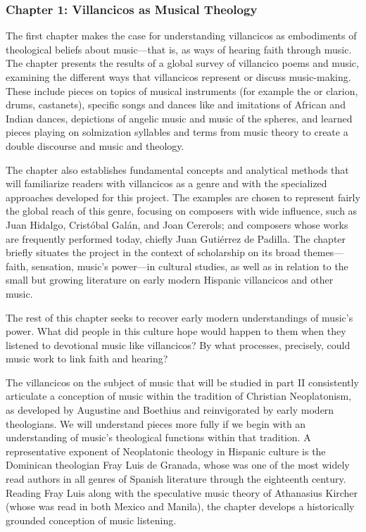 \documentclass{vcbook-proposal}
\begin{document}
\subsubsection{Chapter 1: Villancicos as Musical Theology}

The first chapter makes the case for understanding villancicos as embodiments 
of theological beliefs about music---that is, as ways of hearing faith through 
music.
The chapter presents the results of a global survey of villancico poems and 
music, examining the different ways that villancicos represent or discuss 
music-making.
These include pieces on topics of musical instruments (for example the 
 or clarion, drums, castanets), specific songs and dances like 
 and imitations of African and Indian dances, depictions of 
angelic music and music of the spheres, and learned pieces playing on 
solmization syllables and terms from music theory to create a double discourse 
and music and theology.

The chapter also establishes fundamental concepts and analytical methods that 
will familiarize readers with villancicos as a genre and with the specialized 
approaches developed for this project.
The examples are chosen to represent fairly the global reach of this genre, 
focusing on composers with wide influence, such as Juan Hidalgo, Cristóbal 
Galán, and Joan Cererols; and composers whose works are frequently performed 
today, chiefly Juan Gutiérrez de Padilla.
The chapter briefly situates the project in the context of scholarship on its 
broad themes---faith, sensation, music's power---in cultural studies, as well 
as in relation to the small but growing literature on early modern Hispanic 
villancicos and other music.

The rest of this chapter seeks to recover early modern understandings of music's
power.
What did people in this culture hope would happen to them when they listened to 
devotional music like villancicos?
By what processes, precisely, could music work to link faith and hearing?

The villancicos on the subject of music that will be studied in part II 
consistently articulate a conception of music within the tradition of Christian 
Neoplatonism, as developed by Augustine and Boethius and reinvigorated by early 
modern theologians.
We will understand pieces more fully if we begin with an understanding of 
music's theological functions within that tradition.
A representative exponent of Neoplatonic theology in Hispanic culture is the 
Dominican theologian Fray Luis de Granada, whose was one of the most widely 
read authors in all genres of Spanish literature through the eighteenth 
century.%
  \autocite{LuisdeGranada:Simbolo}
Reading Fray Luis along with the speculative music theory of Athanasius Kircher 
(whose  was read in both Mexico and Manila), 
the chapter develops a historically grounded conception of music listening.
\end{document}
